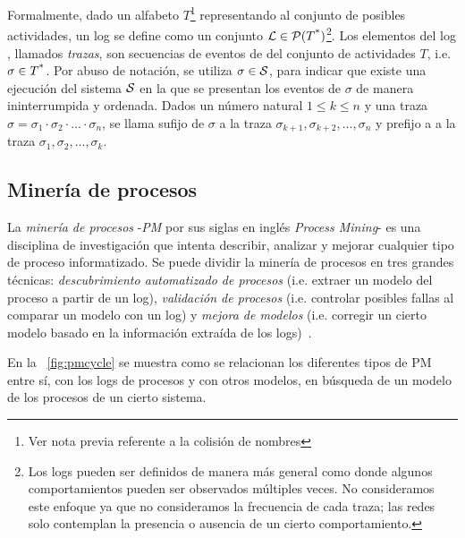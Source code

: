 Formalmente, dado un alfabeto $T$\footnote{Ver nota previa referente a la colisión de nombres} representando
al conjunto de posibles actividades, un log se define como un conjunto ${\mathcal L} \in \mathcal{P}(T\textsuperscript{*})$\footnote{
Los logs pueden ser definidos de manera más general como  donde algunos comportamientos
pueden ser observados múltiples veces. No consideramos este enfoque ya que no consideramos 
la frecuencia de cada traza; las redes solo contemplan la presencia o ausencia de un cierto comportamiento.}. 
Los elementos del log \pmlog, llamados \textit{trazas}, son secuencias de eventos de del conjunto
de actividades $T$, i.e. $\sigma \in T\textsuperscript{*}$. 
Por abuso de notación, se utiliza $\sigma \in \mathcal{S}$, para indicar que existe una ejecución del sistema $\mathcal{S}$
en la que se presentan los eventos de $\sigma$ de manera ininterrumpida y ordenada.
Dados un número natural $1 \leq k \leq n$ y una traza $\sigma=\sigma_1\cdot\sigma_2\cdot\ldots\cdot\sigma_n$, 
se llama sufijo de $\sigma$  a la traza $\sigma_{k+1},\sigma_{k+2},\dots,\sigma_n$
y  prefijo a a la traza $\sigma_1,\sigma_2,\dots,\sigma_k$.


\subsection{Minería de procesos} 
\label{sec:2.process mining subsection}

La \textit{minería de procesos} -\textit{PM} por sus siglas en inglés \textit{Process Mining}-
es una disciplina de investigación que intenta describir, analizar y mejorar cualquier
tipo de proceso informatizado. Se puede dividir la minería de procesos en tres grandes técnicas: \textit{descubrimiento automatizado
de procesos} (i.e. extraer un modelo del proceso a partir de un log), \textit{validación de procesos} (i.e. controlar posibles fallas 
al comparar un modelo con un log) y \textit{mejora de modelos} (i.e. corregir un cierto modelo basado en la información extraída de los logs)~\cite{Aalst2004,AalstBook,FahlandA15}.

En la ~\autoref{fig:pmcycle} se muestra como se relacionan los diferentes tipos de PM entre sí, con los logs de procesos
y con otros modelos, en búsqueda de un modelo de los procesos de un cierto sistema.

